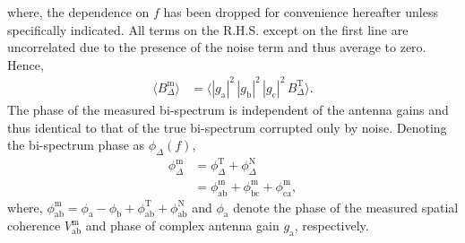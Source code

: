 \documentclass[
reprint,
superscriptaddress,
amsmath,
amssymb,
aps,
prd
]{revtex4-1}
\begin{document}
where, the dependence on $f$ has been dropped for convenience hereafter unless specifically indicated. All terms on the R.H.S. except on the first line are uncorrelated due to the presence of the noise term and thus average to zero. Hence, 
\begin{align}
  \langle B_\Delta^\textrm{m}\rangle &= \langle |g_\textrm{a}|^2\, |g_\textrm{b}|^2\, |g_\textrm{c}|^2\, B_\Delta^\textrm{T}\rangle. \label{eqn:closure-asymptotic}
\end{align}
The phase of the measured bi-spectrum is independent of the antenna gains and thus identical to that of the true bi-spectrum corrupted only by noise. Denoting the bi-spectrum phase as $\phi_\Delta(f)$, 
\begin{align}
  \phi_\Delta^\textrm{m} &= \phi_\Delta^\textrm{T} + \phi_\Delta^\textrm{N} \label{eqn:cpphase-sum-sky-noise} \\
  &= \phi_\textrm{ab}^\textrm{m} + \phi_\textrm{bc}^\textrm{m} + \phi_\textrm{ca}^\textrm{m} \label{eqn:cpphase-sum-of-visphases},
\end{align}
where, $\phi_\textrm{ab}^\textrm{m} = \phi_\textrm{a} - \phi_\textrm{b} + \phi_\textrm{ab}^\textrm{T} + \phi_\textrm{ab}^\textrm{N}$ and $\phi_\textrm{a}$ denote the phase of the measured spatial coherence $V_\textrm{ab}^\textrm{m}$ and phase of complex antenna gain $g_\textrm{a}$, respectively. 
\end{document}
